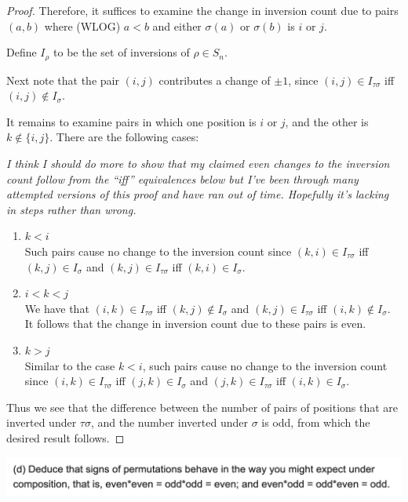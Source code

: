 \begin{proof}
  Therefore, it suffices to examine the change in inversion count due to pairs $(a, b)$ where
  (WLOG) $a < b$ and either $\sigma(a)$ or $\sigma(b)$ is $i$ or $j$.

  Define $I_\rho$ to be the set of inversions of $\rho \in S_n$.









  Next note that the pair $(i, j)$ contributes a change of $\pm 1$, since
  $(i, j) \in I_{\tau\sigma}$ iff $(i, j) \notin I_\sigma$.

  It remains to examine pairs in which one position is $i$ or $j$, and the other is
  $k \notin \{i, j\}$. There are the following cases:

  {\it I think I should do more to show that my claimed even changes to the inversion count follow
    from the ``iff​'' equivalences below but I've been through many attempted versions of this proof
    and have ran out of time. Hopefully it's lacking in steps rather than wrong.}

  \begin{enumerate}
  \item $k < i$\\
    Such pairs cause no change to the inversion count since $(k, i) \in I_{\tau\sigma}$ iff
    $(k, j) \in I_{\sigma}$ and $(k, j) \in I_{\tau\sigma}$ iff $(k, i) \in I_{\sigma}$.
  \item $i < k < j$\\
    We have that $(i, k) \in I_{\tau\sigma}$ iff $(k, j) \notin I_\sigma$ and
    $(k, j) \in I_{\tau\sigma}$ iff $(i, k) \notin I_\sigma$. It follows that the change in inversion count due to
    these pairs is even.
  \item $k > j$\\
    Similar to the case $k < i$, such pairs cause no change to the inversion count
    since $(i, k) \in I_{\tau\sigma}$ iff $(j, k) \in I_{\sigma}$ and $(j, k) \in I_{\tau\sigma}$ iff $(i, k) \in I_{\sigma}$.
  \end{enumerate}

  Thus we see that the difference between the number of pairs of positions that are inverted
  under $\tau\sigma$, and the number inverted under $\sigma$ is odd, from which the desired result follows.
\end{proof}


\begin{mdframed}
\includegraphics[width=400pt]{img/algebra--nf--2-05a9.png}
\end{mdframed}

